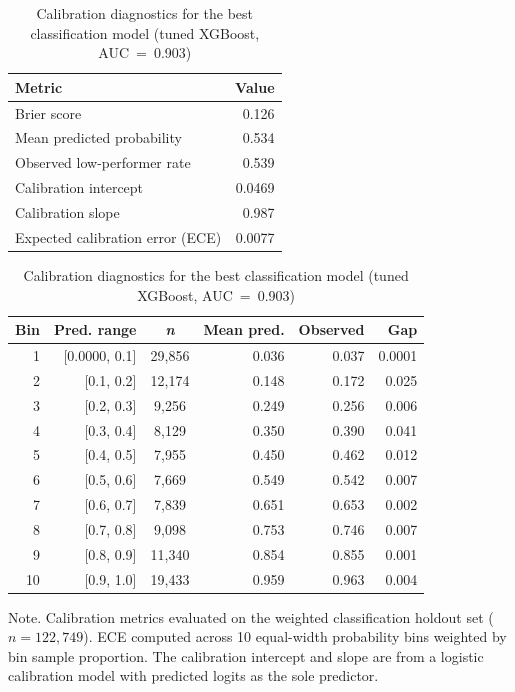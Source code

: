 \begin{table}[htp]
\centering
\small
\caption{Calibration diagnostics for the best classification model (tuned XGBoost, AUC~=~0.903)\label{tab:calibration}}
\begin{tabular}{@{}lr@{}}
\toprule
\textbf{Metric} & \textbf{Value} \\
\midrule
  Brier score & 0.126 \\
  Mean predicted probability & 0.534 \\
  Observed low-performer rate & 0.539 \\
  Calibration intercept & 0.0469 \\
  Calibration slope & 0.987 \\
  Expected calibration error (ECE) & 0.0077 \\
\bottomrule
\end{tabular}

\vspace{2pt}

\begin{tabular}{@{}rrcrrr@{}}
\toprule
\textbf{Bin} & \textbf{Pred. range} & \textbf{\textit{n}} & \textbf{Mean pred.} & \textbf{Observed} & \textbf{Gap} \\
\midrule
  1 & [0.0000, 0.1] & 29,856 & 0.036 & 0.037 & 0.0001 \\
  2 & [0.1, 0.2] & 12,174 & 0.148 & 0.172 & 0.025 \\
  3 & [0.2, 0.3] & 9,256 & 0.249 & 0.256 & 0.006 \\
  4 & [0.3, 0.4] & 8,129 & 0.350 & 0.390 & 0.041 \\
  5 & [0.4, 0.5] & 7,955 & 0.450 & 0.462 & 0.012 \\
  6 & [0.5, 0.6] & 7,669 & 0.549 & 0.542 & 0.007 \\
  7 & [0.6, 0.7] & 7,839 & 0.651 & 0.653 & 0.002 \\
  8 & [0.7, 0.8] & 9,098 & 0.753 & 0.746 & 0.007 \\
  9 & [0.8, 0.9] & 11,340 & 0.854 & 0.855 & 0.001 \\
  10 & [0.9, 1.0] & 19,433 & 0.959 & 0.963 & 0.004 \\
\bottomrule
\end{tabular}
\begin{tablenotes}
\item Note. Calibration metrics evaluated on the weighted classification holdout set ($n = 122{,}749$). ECE computed across 10 equal-width probability bins weighted by bin sample proportion. The calibration intercept and slope are from a logistic calibration model with predicted logits as the sole predictor.
\end{tablenotes}
\end{table}
